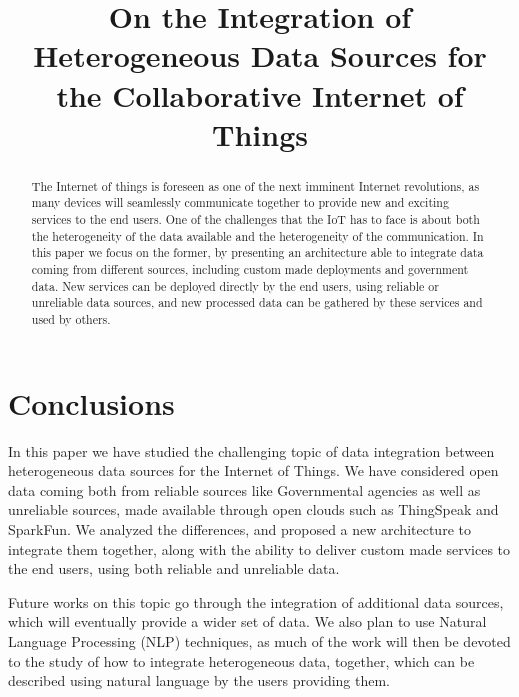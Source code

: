 \documentclass[conference]{IEEEtran}
\title{On the Integration of Heterogeneous Data Sources for the Collaborative Internet of Things}
\author{\IEEEauthorblockN{Federico Montori, Luca Bedogni, Luciano Bononi
\IEEEauthorblockA{
Department of Computer Science and Engineering (DISI)\\
University of Bologna, Italy\\
Email: \{federico.montori2, luca.bedogni4, luciano.bononi\}@unibo.it}}
}
\begin{document}
\maketitle

\begin{abstract}
The Internet of things is foreseen as one of the next imminent Internet revolutions, as many devices will seamlessly communicate together to provide new and exciting services to the end users. One of the challenges that the IoT has to face is about both the heterogeneity of the data available and the heterogeneity of the communication. In this paper we focus on the former, by presenting an architecture able to integrate data coming from different sources, including custom made deployments and government data. \color{red}New services can be deployed directly by the end users, using reliable or unreliable data sources, and new processed data can be gathered by these services and used by others.\color{black}

\end{abstract}











\section{Conclusions}
\label{sec:conclusions}
\color{red}
In this paper we have studied the challenging topic of data integration between heterogeneous data sources for the Internet of Things. We have considered open data coming both from reliable sources like Governmental agencies as well as unreliable sources, made available through open clouds such as ThingSpeak and SparkFun. We analyzed the differences, and proposed a new architecture to integrate them together, along with the ability to deliver custom made services to the end users, using both reliable and unreliable data.

Future works on this topic go through the integration of additional data sources, which will eventually provide a wider set of data. We also plan to use Natural Language Processing (NLP) techniques, as much of the work will then be devoted to the study of how to integrate heterogeneous data, together, which can be described using natural language by the users providing them.
\color{black}






\end{document}
